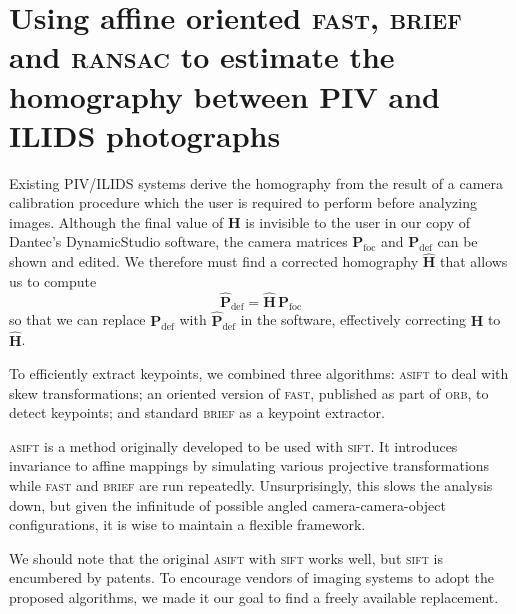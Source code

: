 \documentclass[floatfix,aip,rsi,reprint,graphicx]{revtex4-1}
\begin{document}
\section{Using affine oriented \textsc{fast}, \textsc{brief} and \textsc{ransac} to estimate the homography
between PIV and ILIDS photographs \label{sec:results}}

Existing PIV/ILIDS systems derive the homography from the result of a camera
calibration procedure which the user is required to perform before analyzing
images.
Although the final value of $\mathbf{H}$ is invisible to the user in our copy of
Dantec's DynamicStudio software, the camera matrices $\mathbf{P}_\text{foc}$ and
$\mathbf{P}_\text{def}$ can be shown and edited. We therefore must find a
corrected homography $\mathbf{\hat{H}}$ that allows us to compute
\begin{equation}
    \mathbf{\hat{P}}_\text{def} = \mathbf{\hat{H}} \, \mathbf{P}_\text{foc}
    \label{corrected-homography-use}
\end{equation}
so that we can replace $\mathbf{P}_\text{def}$ with $\mathbf{\hat{P}}_\text{def}$ in
the software, effectively correcting $\mathbf{H}$ to $\mathbf{\hat{H}}$.

To efficiently extract keypoints, we combined three algorithms:
\textsc{asift}\cite{Morel09} to deal with skew transformations; an oriented version of
\textsc{fast}, published as part of \textsc{orb}, to detect keypoints; and
standard \textsc{brief} as a keypoint extractor.

\textsc{asift} is a method originally developed to be used with \textsc{sift}.
It introduces invariance to affine mappings by simulating various
projective transformations while \textsc{fast} and \textsc{brief} are run repeatedly.
Unsurprisingly, this slows the analysis down, but given the infinitude of
possible angled camera-camera-object configurations, it is wise to maintain a
flexible framework.

We should note that the original \textsc{asift} with
\textsc{sift} works well, but \textsc{sift} is encumbered by patents. To
encourage vendors of imaging systems to adopt the proposed algorithms, we made
it our goal to find a freely available replacement.
\end{document}
